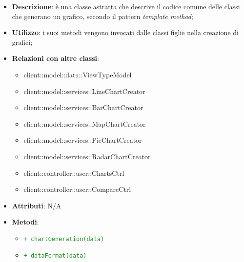 			\begin{itemize}
				\item \textbf{Descrizione}: è una classe astratta che descrive il codice comune delle classi che generano un grafico, secondo il pattern \emph{template method};
				\item \textbf{Utilizzo}: i suoi metodi vengono invocati dalle classi figlie nella creazione di grafici;
				\item \textbf{Relazioni con altre classi}:
					\begin{itemize}
						\item client::model::data::ViewTypeModel
						\item client::model::services::LineChartCreator
						\item client::model::services::BarChartCreator
						\item client::model::services::MapChartCreator
						\item client::model::services::PieChartCreator
						\item client::model::services::RadarChartCreator
						\item client::controller::user::ChartsCtrl
						\item client::controller::user::CompareCtrl
					\end{itemize}
				\item \textbf{Attributi}: N/A
				\item \textbf{Metodi}: 
					\begin{itemize}
						\item \textcolor{forestgreen}{\texttt{+ chartGeneration(data)}}
						\item \textcolor{forestgreen}{\texttt{+ dataFormat(data)}}

					\end{itemize}
			\end{itemize}

